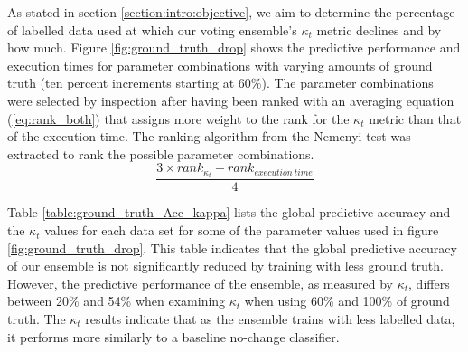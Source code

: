 \documentclass[runningheads]{llncs}
\begin{document}
As stated in section \ref{section:intro:objective}, we aim to determine the percentage of labelled data used at which our voting ensemble's $\kappa_t$ metric declines and by how much. Figure \ref{fig:ground_truth_drop} shows the predictive performance and execution times for parameter combinations with varying amounts of ground truth (ten percent increments starting at 60\%). The parameter combinations were selected by inspection after having been ranked with an averaging equation (\ref{eq:rank_both}) that assigns more weight to the rank for the $\kappa_t$ metric than that of the execution time. The ranking algorithm from the Nemenyi test was extracted to rank the possible parameter combinations.
\begin{equation}
\label{eq:rank_both}
\frac{3\times rank_{\kappa_t}+rank_{execution\ time}}{4}
\end{equation}

Table \ref{table:ground_truth_Acc_kappa} lists the global predictive accuracy and the $\kappa_t$ values for each data set for some of the parameter values used in figure \ref{fig:ground_truth_drop}. This table indicates that the global predictive accuracy of our ensemble is not significantly reduced by training with less ground truth. However, the predictive performance of the ensemble, as measured by $\kappa_t$, differs between 20\% and 54\% when examining $\kappa_t$ when using 60\% and 100\% of ground truth. The $\kappa_t$ results indicate that as the ensemble trains with less labelled data, it performs more similarly to a baseline no-change classifier.
\end{document}
